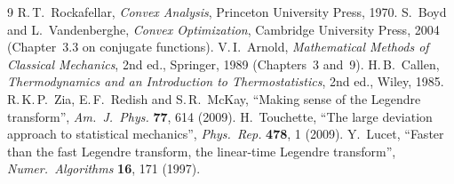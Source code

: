 \documentclass[11pt,a4paper]{article}
\theoremstyle{plain}
\theoremstyle{definition}
\theoremstyle{remark}
\begin{document}
\begin{thebibliography}{9}
 R.\,T.~Rockafellar, \emph{Convex Analysis},
  Princeton University Press, 1970.
 S.~Boyd and L.~Vandenberghe, \emph{Convex Optimization},
  Cambridge University Press, 2004 (Chapter~3.3 on conjugate functions).
 V.\,I.~Arnold, \emph{Mathematical Methods of Classical
  Mechanics}, 2nd ed., Springer, 1989 (Chapters~3 and~9).
 H.\,B.~Callen, \emph{Thermodynamics and an Introduction to
  Thermostatistics}, 2nd ed., Wiley, 1985.
 R.\,K.\,P.~Zia, E.\,F.~Redish and S.\,R.~McKay, ``Making sense
  of the Legendre transform'', \emph{Am.\ J.\ Phys.} \textbf{77}, 614 (2009).
 H.~Touchette, ``The large deviation approach to
  statistical mechanics'', \emph{Phys.\ Rep.} \textbf{478}, 1 (2009).
 Y.~Lucet, ``Faster than the fast Legendre transform, the
  linear-time Legendre transform'', \emph{Numer.\ Algorithms} \textbf{16},
  171 (1997).
\end{thebibliography}
\end{document}
